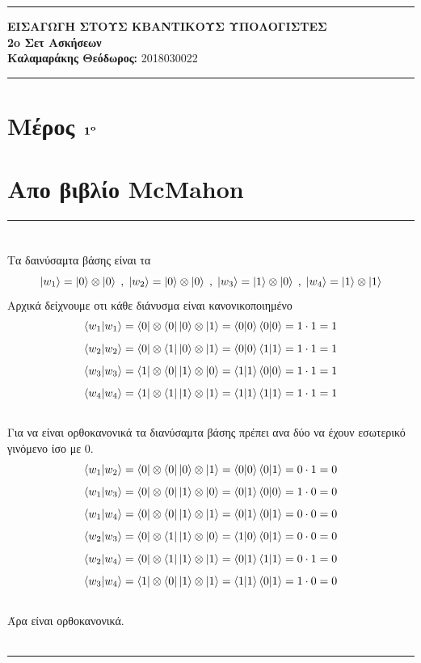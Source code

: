 \documentclass[12pt]{article}
\begin{document}
\greektext

\noindent\rule{\textwidth}{2pt}
\begin{center}
{\bf ΕΙΣΑΓΩΓΗ ΣΤΟΥΣ ΚΒΑΝΤΙΚΟΥΣ ΥΠΟΛΟΓΙΣΤΕΣ}\\ 
{\bf 2o Σετ Ασκήσεων }\\
{\bf Καλαμαράκης Θεόδωρος:} 2018030022\\
\end{center}
\rule{\textwidth}{.5pt}
\noindent

\begin{center}

\end{center}
 
 

\justifying

\section*{{\bf Μέρος  $\bf 1^o$ }}
\section*{Απο βιβλίο \textlatin{McMahon}}
\rule{\textwidth}{.5pt}
\section*{{}}
Τα δαινύσαμτα βάσης είναι τα 
$$\ket{w_1}=\ket{0}  \otimes \ket{0}\;,\; \ket{w_2}=\ket{0}  \otimes \ket{0}\;,\; \ket{w_3}=\ket{1}  \otimes \ket{0}\;,\; \ket{w_4}=\ket{1}  \otimes \ket{1}$$
Αρχικά δείχνουμε οτι κάθε διάνυσμα είναι κανονικοποιημένο 
$$\braket{w_1|w_1} = \bra{0}\otimes \bra{0} \ket{0}\otimes\ket{1}=  \braket{0|0}\braket{0|0} = 1\cdot1=1$$
$$\braket{w_2|w_2} = \bra{0}\otimes \bra{1} \ket{0}\otimes\ket{1}=  \braket{0|0}\braket{1|1} = 1\cdot1=1$$
$$\braket{w_3|w_3} = \bra{1}\otimes \bra{0} \ket{1}\otimes\ket{0}=  \braket{1|1}\braket{0|0} = 1\cdot1=1$$
$$\braket{w_4|w_4} = \bra{1}\otimes \bra{1} \ket{1}\otimes\ket{1}=  \braket{1|1}\braket{1|1} = 1\cdot1=1$$\\
Για να είναι ορθοκανονικά τα διανύσαμτα βάσης πρέπει ανα δύο να έχουν εσωτερικό γινόμενο ίσο με 0.
$$\braket{w_1|w_2} = \bra{0}\otimes \bra{0} \ket{0}\otimes\ket{1}=  \braket{0|0}\braket{0|1} = 0\cdot1=0$$
$$\braket{w_1|w_3} = \bra{0}\otimes \bra{0} \ket{1}\otimes\ket{0}=  \braket{0|1}\braket{0|0} = 1\cdot0=0$$
$$\braket{w_1|w_4} = \bra{0}\otimes \bra{0} \ket{1}\otimes\ket{1}=  \braket{0|1}\braket{0|1} = 0\cdot0=0$$
$$\braket{w_2|w_3} = \bra{0}\otimes \bra{1} \ket{1}\otimes\ket{0}=  \braket{1|0}\braket{0|1} = 0\cdot0=0$$
$$\braket{w_2|w_4} = \bra{0}\otimes \bra{1} \ket{1}\otimes\ket{1}=  \braket{0|1}\braket{1|1} = 0\cdot1=0$$
$$\braket{w_3|w_4} = \bra{1}\otimes \bra{0} \ket{1}\otimes\ket{1}=  \braket{1|1}\braket{0|1} = 1\cdot0=0$$\\
Άρα είναι ορθοκανονικά.\\
\\ \rule{\textwidth}{.5pt}
\end{document}

